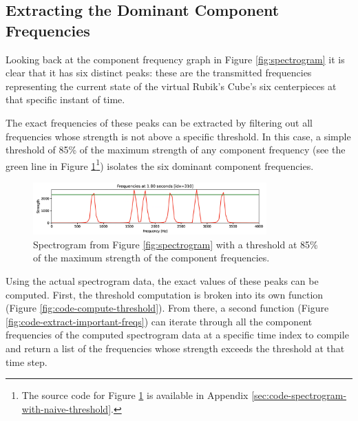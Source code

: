 \subsection{Extracting the Dominant Component Frequencies}
\label{subsec:extract-dominant-freqs}

Looking back at the component frequency graph in Figure
\ref{fig:spectrogram} it is clear that it has six distinct peaks: these
are the transmitted frequencies representing the current state of the
virtual Rubik's Cube's six centerpieces at that specific instant of
time.

The exact frequencies of these peaks can be extracted by filtering out
all frequencies whose strength is not above a specific threshold. In
this case, a simple threshold of 85\% of the maximum strength of any
component frequency (see the green line in Figure
\ref{fig:spectrogram-with-naive-threshold}\footnote{The source code for
Figure \ref{fig:spectrogram-with-naive-threshold} is available in
Appendix \ref{sec:code-spectrogram-with-naive-threshold}.}) isolates
the six dominant component frequencies.

\begin{figure}[h]
    \centering
    \caption{Spectrogram from Figure \ref{fig:spectrogram} with a threshold at 85\% of the maximum strength of the component frequencies. }
    \label{fig:spectrogram-with-naive-threshold}
    \includegraphics[width=0.8\textwidth]{Figures/5 Algorithm Design/threshold.png}
\end{figure}

Using the actual spectrogram data, the exact values of these peaks can
be computed. First, the threshold computation is broken into its own
function (Figure \ref{fig:code-compute-threshold}). From there, a
second function (Figure \ref{fig:code-extract-important-freqs}) can
iterate through all the component frequencies of the computed
spectrogram data at a specific time index to compile and return a list
of the frequencies whose strength exceeds the threshold at that time
step.

